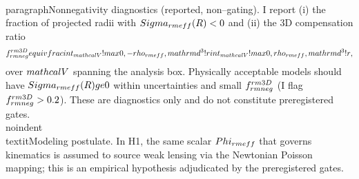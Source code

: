 \documentclass[11pt,a4paper]{article}
\begin{document}
\\paragraph{Nonnegativity diagnostics (reported, non–gating).}
I report (i) the fraction of projected radii with $\\Sigma_{\\rm eff}(R)<0$ and (ii) the 3D compensation ratio
\[
f_{\\rm neg}^{\\rm 3D} \\equiv \\frac{\\int_{\\mathcal V}\\!\\max\\{0,-\\rho_{\\rm eff}\\}\\,\\mathrm{d}^3\\!r}
{\\int_{\\mathcal V}\\!\\max\\{0,\\rho_{\\rm eff}\\}\\,\\mathrm{d}^3\\!r},
\]
over $\\mathcal V$ spanning the analysis box. Physically acceptable models should have $\\Sigma_{\\rm eff}(R)\\ge 0$ within uncertainties and small $f_{\\rm neg}^{\\rm 3D}$ (I flag $f_{\\rm neg}^{\\rm 3D}>0.2$). These are diagnostics only and do not constitute preregistered gates.
\\noindent\\textit{Modeling postulate.} In H1, the same scalar $\\Phi_{\\rm eff}$ that governs kinematics is assumed to source weak lensing via the Newtonian Poisson mapping; this is an empirical hypothesis adjudicated by the preregistered gates.
\end{document}
